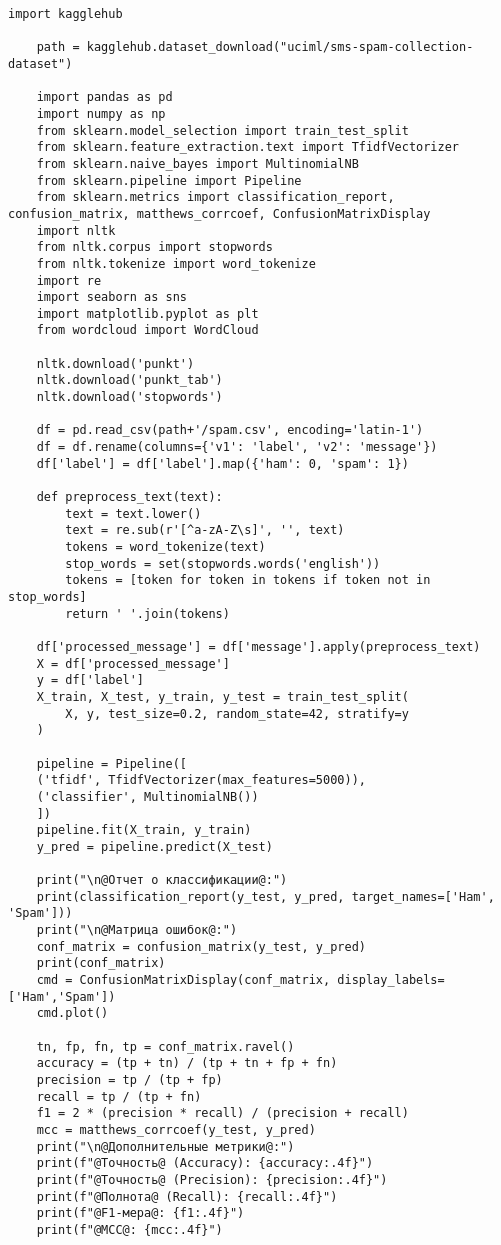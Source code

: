 \begin{lstlisting}[label=lst:1,caption=Фильтрация спама с использованием наивного байесовского классификатора]
	import kagglehub
	
	path = kagglehub.dataset_download("uciml/sms-spam-collection-dataset")
	
	import pandas as pd
	import numpy as np
	from sklearn.model_selection import train_test_split
	from sklearn.feature_extraction.text import TfidfVectorizer
	from sklearn.naive_bayes import MultinomialNB
	from sklearn.pipeline import Pipeline
	from sklearn.metrics import classification_report, confusion_matrix, matthews_corrcoef, ConfusionMatrixDisplay
	import nltk
	from nltk.corpus import stopwords
	from nltk.tokenize import word_tokenize
	import re
	import seaborn as sns
	import matplotlib.pyplot as plt
	from wordcloud import WordCloud
	
	nltk.download('punkt')
	nltk.download('punkt_tab')
	nltk.download('stopwords')
	
	df = pd.read_csv(path+'/spam.csv', encoding='latin-1')
	df = df.rename(columns={'v1': 'label', 'v2': 'message'})
	df['label'] = df['label'].map({'ham': 0, 'spam': 1})
	
	def preprocess_text(text):
		text = text.lower()
		text = re.sub(r'[^a-zA-Z\s]', '', text)
		tokens = word_tokenize(text)
		stop_words = set(stopwords.words('english'))
		tokens = [token for token in tokens if token not in stop_words]
		return ' '.join(tokens)
	
	df['processed_message'] = df['message'].apply(preprocess_text)
	X = df['processed_message']
	y = df['label']
	X_train, X_test, y_train, y_test = train_test_split(
		X, y, test_size=0.2, random_state=42, stratify=y
	)
	
	pipeline = Pipeline([
	('tfidf', TfidfVectorizer(max_features=5000)),
	('classifier', MultinomialNB())
	])
	pipeline.fit(X_train, y_train)
	y_pred = pipeline.predict(X_test)
	
	print("\n@Отчет о классификации@:")
	print(classification_report(y_test, y_pred, target_names=['Ham', 'Spam']))
	print("\n@Матрица ошибок@:")
	conf_matrix = confusion_matrix(y_test, y_pred)
	print(conf_matrix)
	cmd = ConfusionMatrixDisplay(conf_matrix, display_labels=['Ham','Spam'])
	cmd.plot()
	
	tn, fp, fn, tp = conf_matrix.ravel()
	accuracy = (tp + tn) / (tp + tn + fp + fn)
	precision = tp / (tp + fp)
	recall = tp / (tp + fn)
	f1 = 2 * (precision * recall) / (precision + recall)
	mcc = matthews_corrcoef(y_test, y_pred)
	print("\n@Дополнительные метрики@:")
	print(f"@Точность@ (Accuracy): {accuracy:.4f}")
	print(f"@Точность@ (Precision): {precision:.4f}")
	print(f"@Полнота@ (Recall): {recall:.4f}")
	print(f"@F1-мера@: {f1:.4f}")
	print(f"@MCC@: {mcc:.4f}")
	

\end{lstlisting}
